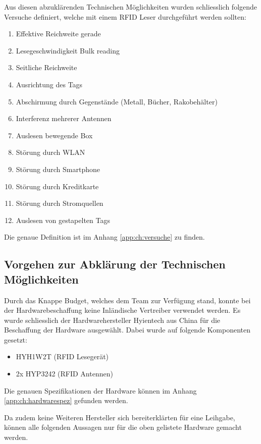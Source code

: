 Aus diesen abzuklärenden Technischen Möglichkeiten wurden schliesslich folgende Versuche definiert, welche mit einem RFID Leser durchgeführt werden sollten:
\begin{enumerate}
	\item Effektive Reichweite gerade
	\item Lesegeschwindigkeit Bulk reading
	\item Seitliche Reichweite
	\item Ausrichtung des Tags
	\item Abschirmung durch Gegenstände (Metall, Bücher, Rakobehälter)
	\item Interferenz mehrerer Antennen
	\item Auslesen bewegende Box
	\item Störung durch WLAN
	\item Störung durch Smartphone
	\item Störung durch Kreditkarte
	\item Störung durch Stromquellen
	\item Auslesen von gestapelten Tags
\end{enumerate}
Die genaue Definition ist im Anhang \ref{app:ch:versuche} zu finden.

\subsection{Vorgehen zur Abklärung der Technischen Möglichkeiten}
Durch das Knappe Budget, welches dem Team zur Verfügung stand, konnte bei der Hardwarebeschaffung keine Inländische Vertreiber verwendet werden. Es wurde schliesslich der Hardwarehersteller Hyientech aus China für die Beschaffung der Hardware ausgewählt. Dabei wurde auf folgende Komponenten gesetzt:
\begin{itemize}
	\item HYH1W2T (RFID Lesegerät)
	\item 2x HYP3242 (RFID Antennen)
\end{itemize}
Die genauen Spezifikationen der Hardware können im Anhang \ref{app:ch:hardwarespez} gefunden werden.

Da zudem keine Weiteren Hersteller sich bereiterklärten für eine Leihgabe, können alle folgenden Aussagen nur für die oben gelistete Hardware gemacht werden.

